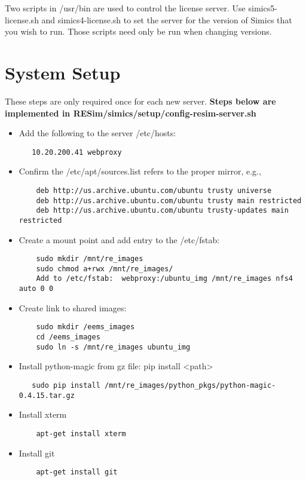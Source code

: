 \documentclass[titlepage]{article}
\begin{document}
Two scripts in /usr/bin are used to control the license server.  Use simics5-license.sh and simics4-license.sh to set the server for the
version of Simics that you wish to run.  Those scripts need only be run when changing versions.

\section{System Setup} 
\label{section-system}
These steps are only required once for each new server.
\textbf{Steps below are implemented in RESim/simics/setup/config-resim-server.sh}


\begin{itemize}
\item Add the following to the server /etc/hosts:
\begin{verbatim}
   10.20.200.41 webproxy
\end{verbatim}


\item Confirm the /etc/apt/sources.list refers to the proper mirror, e.g., 
\begin{verbatim}
    deb http://us.archive.ubuntu.com/ubuntu trusty universe
    deb http://us.archive.ubuntu.com/ubuntu trusty main restricted
    deb http://us.archive.ubuntu.com/ubuntu trusty-updates main restricted
\end{verbatim}


\item Create a mount point and add entry to the /etc/fstab:
\begin{verbatim}
    sudo mkdir /mnt/re_images
    sudo chmod a+rwx /mnt/re_images/
    Add to /etc/fstab:  webproxy:/ubuntu_img /mnt/re_images nfs4 auto 0 0
\end{verbatim}

\item Create link to shared images:
\begin{verbatim}
    sudo mkdir /eems_images
    cd /eems_images
    sudo ln -s /mnt/re_images ubuntu_img
\end{verbatim}


\item Install python-magic from gz file:  pip install <path>
\begin{verbatim}
   sudo pip install /mnt/re_images/python_pkgs/python-magic-0.4.15.tar.gz
\end{verbatim}

\item Install xterm
\begin{verbatim}
    apt-get install xterm
\end{verbatim}

\item Install git
\begin{verbatim}
    apt-get install git
\end{verbatim}
\end{itemize}
\end{document}
